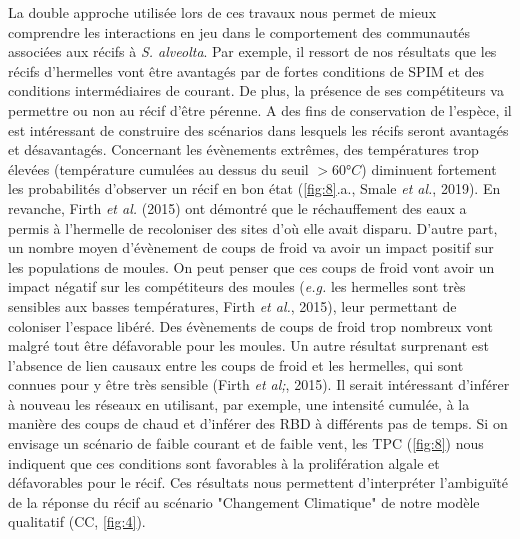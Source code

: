 \documentclass[12pt]{report}
\begin{document}
La double approche utilisée lors de ces travaux nous permet de mieux comprendre les interactions en jeu dans le comportement des communautés associées aux récifs à \textit{S. alveolta}. Par exemple, il ressort de nos résultats que les récifs d'hermelles vont être avantagés par de fortes conditions de SPIM et des conditions intermédiaires de courant. De plus, la présence de ses compétiteurs va permettre ou non au récif d'être pérenne. A des fins de conservation de l'espèce, il est intéressant de construire des scénarios dans lesquels les récifs seront avantagés et désavantagés. 
\newline \newline
Concernant les évènements extrêmes, des températures trop élevées (température cumulées au dessus du seuil $>60°C$) diminuent fortement les probabilités d'observer un récif en bon état (\autoref{fig:8}.a., Smale \textit{et al.}, 2019). En revanche, Firth \textit{et al.} (2015) ont démontré que le réchauffement des eaux a permis à l'hermelle de recoloniser des sites d'où elle avait disparu. 
D'autre part, un nombre moyen d'évènement de coups de froid va avoir un impact positif sur les populations de moules. On peut penser que ces coups de froid vont avoir un impact négatif sur les compétiteurs des moules (\textit{e.g.} les hermelles sont très sensibles aux basses températures, Firth \textit{et al.}, 2015), leur permettant de coloniser l'espace libéré. Des évènements de coups de froid trop nombreux vont malgré tout être défavorable pour les moules. Un autre résultat surprenant est l'absence de lien causaux entre les coups de froid et les hermelles, qui sont connues pour y être très sensible (Firth \textit{et al;}, 2015). Il serait intéressant d'inférer à nouveau les réseaux en utilisant, par exemple, une intensité cumulée, à la manière des coups de chaud et d'inférer des RBD à différents pas de temps.
\newline \newline
Si on envisage un scénario de faible courant et de faible vent, les TPC (\autoref{fig:8}) nous indiquent que ces conditions sont favorables à la prolifération algale et défavorables pour le récif. Ces résultats nous permettent d'interpréter l'ambiguïté de la réponse du récif au scénario "Changement Climatique" de notre modèle qualitatif (CC, \autoref{fig:4}). 
\end{document}
